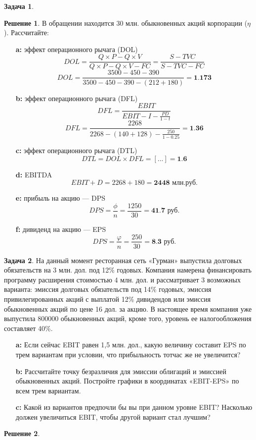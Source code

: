 \documentclass[a4paper, 14pt]{article}
\theoremstyle{plain} %
\theoremstyle{definition} %
\newtheorem*{solution}{Решение}
\newtheorem{problem}{Задача}[subsection]
\theoremstyle{remark} %
\begin{document}
\begin{problem}
\begin{solution}
В обращении находится 30 млн. обыкновенных акций корпорации ($\eta$). Рассчитайте:
\begin{itemize}
	\item[\textbf{a:}] эффект операционного рычага (DOL)
	\[
		DOL = \frac{Q\times P-Q \times V}{Q \times P-Q \times V-FC} = \frac{S-TVC}{S-TVC-FC}
	\]
	\[
		DOL = \frac{3500-450-390}{3500-450-390-(212+180)} = \textbf{1.173}
	\]
	\item[\textbf{b:}] эффект операционного рычага (DFL)
	\[
		DFL = \frac{EBIT}{EBIT-I-\frac{PD}{1-t}}
	\]
	\[
		DFL = \frac{2268}{2268-(140+128)-\frac{250}{1-0.25}} = \textbf{1.36}
	\]
	\item[\textbf{c:}] эффект операционного рычага (DTL)
	\[
		DTL = DOL \times DFL = [...] = \textbf{1.6}
	\]
	\item[\textbf{d:}] EBITDA
	\[
		EBIT + D = 2268 + 180 = \textbf{2448 млн.руб.}
	\]
	\item[\textbf{e:}] прибыль на акцию --- DPS
	\[
		DPS = \frac{\phi}{n} = \frac{1250}{30} = \textbf{41.7 руб.}
	\]
	\item[\textbf{f:}] дивиденд на акцию --- EPS
	\[
		DPS = \frac{\varphi}{n} = \frac{250}{30} = \textbf{8.3 руб.}
	\]
\end{itemize}
\end{solution}
\end{problem}

\begin{problem}
	На данный момент ресторанная сеть «Гурман» выпустила долговых обязательств на 3 млн.  дол.  под  12\%  годовых.  Компания намерена финансировать программу расширения стоимостью   4   млн.   дол.   и рассматривает   3   возможных варианта:   эмиссия долговых обязательств под   14\%   годовых,   эмиссия привилегированных акций с выплатой   12\% дивидендов или эмиссия обыкновенных акций по цене 16 дол. за акцию. В настоящее время компания уже выпустила    800000    обыкновенных акций,    кроме того,    уровень ее налогообложения составляет 40\%.
	\begin{itemize}
		\item[\textbf{a:}] Если сейчас EBIT равен  1,5  млн.  дол.,  какую величину составит EPS по трем вариантам при условии, что прибыльность тотчас же не увеличится?
		\item[\textbf{b:}] Рассчитайте точку безразличия для эмиссии облигаций и эмиссией обыкновенных акций. Постройте графики в координатах «EBIT-EPS» по всем трем вариантам.
		\item[\textbf{c:}] Какой из вариантов предпочли бы вы при данном уровне EBIT? Насколько должен увеличиться EBIT, чтобы другой вариант стал лучшим?
	\end{itemize}
	\begin{solution}

	\end{solution}
\end{problem}
\end{document}
